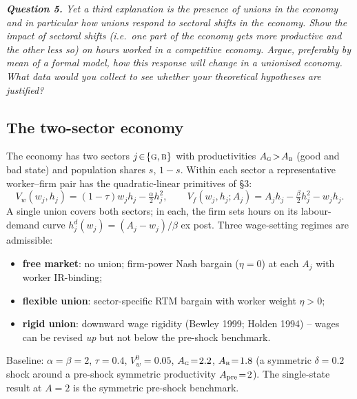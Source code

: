 \documentclass[9pt,a4paper]{extarticle}
\begin{document}
\begingroup\small\itshape\noindent\textbf{Question 5.} Yet a third
explanation is the presence of unions in the economy and in
particular how unions respond to sectoral shifts in the economy.
Show the impact of sectoral shifts (i.e.\ one part of the economy
gets more productive and the other less so) on hours worked in a
competitive economy. Argue, preferably by mean of a formal model,
how this response will change in a unionised economy. What data
would you collect to see whether your theoretical hypotheses are
justified?\endgroup

\subsection{The two-sector economy}
The economy has two sectors $j\!\in\!\{\textsc{g},\textsc{b}\}$ with
productivities $A_{\textsc{g}}\!>\!A_{\textsc{b}}$ (good and bad
state) and population shares $s$, $1\!-\!s$. Within each sector a
representative worker--firm pair has the quadratic-linear primitives
of \S 3:
\[
V_w(w_j,h_j)=(1-\tau)w_j h_j-\tfrac{\alpha}{2}h_j^2,\qquad
V_f(w_j,h_j;A_j)=A_j h_j-\tfrac{\beta}{2}h_j^2-w_j h_j.
\]
A single union covers both sectors; in each, the firm sets hours on
its labour-demand curve $h_j^d(w_j)\!=\!(A_j-w_j)/\beta$ ex post.
Three wage-setting regimes are admissible:
\begin{itemize}\setlength\itemsep{0pt}
\item[(a)] \textbf{free market}: no union; firm-power Nash bargain
($\eta\!=\!0$) at each $A_j$ with worker IR-binding;
\item[(b)] \textbf{flexible union}: sector-specific RTM bargain with
worker weight $\eta\!>\!0$;
\item[(c)] \textbf{rigid union}: downward wage rigidity (Bewley 1999;
Holden 1994) -- wages can be revised \emph{up} but not below the
pre-shock benchmark.
\end{itemize}
Baseline: $\alpha\!=\!\beta\!=\!2$, $\tau\!=\!0.4$, $V_w^0\!=\!0.05$,
$A_{\textsc{g}}\!=\!2.2$, $A_{\textsc{b}}\!=\!1.8$ (a symmetric
$\delta\!=\!0.2$ shock around a pre-shock symmetric productivity
$A_{\rm pre}\!=\!2$). The single-state result at $A\!=\!2$ is the
symmetric pre-shock benchmark.
\end{document}
